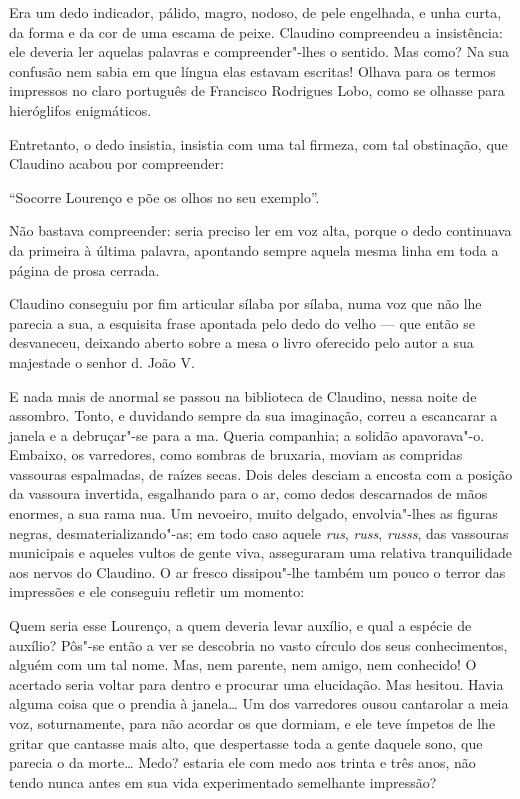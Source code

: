 Era um dedo indicador, pálido, magro, nodoso, de pele engelhada, e unha
curta, da forma e da cor de uma escama de peixe. Claudino compreendeu a
insistência: ele deveria ler aquelas palavras e compreender"-lhes o
sentido. Mas como? Na sua confusão nem sabia em que língua elas estavam
escritas! Olhava para os termos impressos no claro português de
Francisco Rodrigues Lobo, como se olhasse para hieróglifos enigmáticos.

Entretanto, o dedo insistia, insistia com uma tal firmeza, com tal
obstinação, que Claudino acabou por compreender:

``Socorre Lourenço e põe os olhos no seu exemplo''.

Não bastava compreender: seria preciso ler em voz alta, porque o dedo
continuava da primeira à última palavra, apontando sempre aquela mesma
linha em toda a página de prosa cerrada.

Claudino conseguiu por fim articular sílaba por sílaba, numa voz que não
lhe parecia a sua, a esquisita frase apontada pelo dedo do velho --- que
então se desvaneceu, deixando aberto sobre a mesa o livro oferecido pelo
autor a sua majestade o senhor d. João V.

E nada mais de anormal se passou na biblioteca de Claudino, nessa noite
de assombro. Tonto, e duvidando sempre da sua imaginação, correu a
escancarar a janela e a debruçar"-se para a ma. Queria companhia; a
solidão apavorava"-o. Embaixo, os varredores, como sombras de bruxaria,
moviam as compridas vassouras espalmadas, de raízes secas. Dois deles
desciam a encosta com a posição da vassoura invertida, esgalhando para o
ar, como dedos descarnados de mãos enormes, a sua rama nua. Um nevoeiro,
muito delgado, envolvia"-lhes as figuras negras, desmaterializando"-as; em
todo caso aquele \emph{rus}, \emph{russ}, \emph{russs}, das vassouras
municipais e aqueles vultos de gente viva, asseguraram uma relativa
tranquilidade aos nervos do Claudino. O ar fresco dissipou"-lhe
também um pouco o terror das impressões e ele conseguiu refletir um
momento:

Quem seria esse Lourenço, a quem deveria levar auxílio, e qual a espécie
de auxílio? Pôs"-se então a ver se descobria no vasto círculo dos seus
conhecimentos, alguém com um tal nome. Mas, nem parente, nem amigo, nem
conhecido! O acertado seria voltar para dentro e procurar uma
elucidação. Mas hesitou. Havia alguma coisa que o prendia à janela\ldots{} Um
dos varredores ousou cantarolar a meia voz, soturnamente, para não
acordar os que dormiam, e ele teve ímpetos de lhe gritar que cantasse
mais alto, que despertasse toda a gente daquele sono, que parecia o da
morte\ldots{} Medo? estaria ele com medo aos trinta e três anos, não tendo
nunca antes em sua vida experimentado semelhante impressão?

